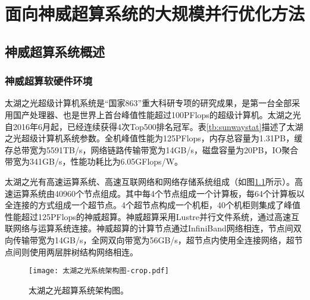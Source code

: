 \chapter{面向神威超算系统的大规模并行优化方法} %
\label{cha:面向神威超算系统的大规模并行优化方法}

\section{神威超算系统概述} %
\label{sec:神威超算系统概述}

\subsection{神威超算软硬件环境}
\label{sub:神威超算软硬件环境}
太湖之光超级计算机系统是“国家863”重大科研专项的研究成果，是第一台全部采用国产处理器、也是世界上首台峰值性能超过100PFlops的超级计算机。太湖之光自2016年6月起，已经连续获得4次Top500排名冠军。表\ref{tb:sunwaystat}描述了太湖之光超级计算机系统参数。全机峰值性能为125PFlops，内存总容量为1.31PB，缓存总带宽为5591TB/s，网络链路传输带宽为14GB/s，磁盘容量为20PB，IO聚合带宽为341GB/s，性能功耗比为6.05GFlops/W。


\begin{table}[ht]
\centering
\caption{太湖之光超级计算机系统基础参数。}
\label{tb:sunwaystat}
\end{table}

太湖之光有高速运算系统、高速互联网络和网络存储系统组成（如图\ref{fig:sunwayarch}所示）。高速运算系统由40960个节点组成。其中每4个节点组成一个计算板，每64个计算板以全连接的方式组成一个超节点。4个超节点构成一个机柜，40个机柜则集成了峰值性能超过125PFlops的神威超算。神威超算采用Lustre并行文件系统，通过高速互联网络与运算系统连接。神威超算的计算节点通过InfiniBand网络相连，节点间双向传输带宽为14GB/s，全网双向带宽为56GB/s，超节点内使用全连接网络，超节点间则使用两层胖树结构网络相连。

\begin{figure}[ht]
\centering
\texttt{[image: 太湖之光系统架构图-crop.pdf]}
\caption{太湖之光超算系统架构图。}
\label{fig:sunwayarch}
\end{figure}

